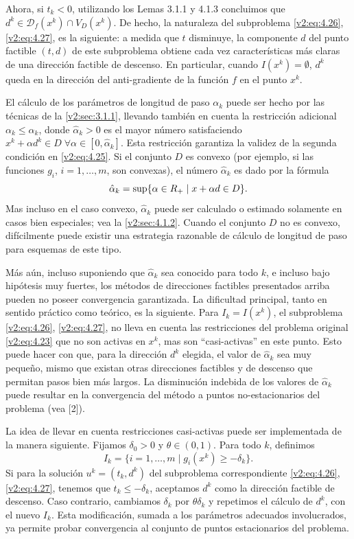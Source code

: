 Ahora, si $t_k < 0$, utilizando los Lemas 3.1.1 y 4.1.3 concluimos que $d^k \in \mathcal{D}_f(x^k) \cap V_D(x^k)$. De hecho, la naturaleza del subproblema \eqref{v2:eq:4.26}, \eqref{v2:eq:4.27}, es la siguiente: a medida que $t$ disminuye, la componente $d$ del punto factible $(t, d)$ de este subproblema obtiene cada vez características más claras de una dirección factible de descenso. En particular, cuando $I(x^k) = \emptyset$, $d^k$ queda en la dirección del anti-gradiente de la función $f$ en el punto $x^k$.

El cálculo de los parámetros de longitud de paso $\alpha_k$ puede ser hecho por las técnicas de la \cref{v2:sec:3.1.1}, llevando también en cuenta la restricción adicional $\alpha_k \le \hat{\alpha}_k$, donde $\hat{\alpha}_k > 0$ es el mayor número satisfaciendo $x^k + \alpha d^k \in D \; \forall \alpha \in [0, \hat{\alpha}_k]$. Esta restricción garantiza la validez de la segunda condición en \eqref{v2:eq:4.25}. Si el conjunto $D$ es convexo (por ejemplo, si las funciones $g_i$, $i = 1, \dots, m$, son convexas), el número $\hat{\alpha}_k$ es dado por la fórmula
\[
    \hat{\alpha}_k = \sup \{\alpha \in R_+ \mid x + \alpha d \in D \}.
\]
Mas incluso en el caso convexo, $\hat{\alpha}_k$ puede ser calculado o estimado solamente en casos bien especiales; vea la \cref{v2:sec:4.1.2}. Cuando el conjunto $D$ no es convexo, difícilmente puede existir una estrategia razonable de cálculo de longitud de paso para esquemas de este tipo.

Más aún, incluso suponiendo que $\hat{\alpha}_k$ sea conocido para todo $k$, e incluso bajo hipótesis muy fuertes, los métodos de direcciones factibles presentados arriba pueden no poseer convergencia garantizada. La dificultad principal, tanto en sentido práctico como teórico, es la siguiente. Para $I_k = I(x^k)$, el subproblema \eqref{v2:eq:4.26}, \eqref{v2:eq:4.27}, no lleva en cuenta las restricciones del problema original \eqref{v2:eq:4.23} que no son activas en $x^k$, mas son ``casi-activas'' en este punto. Esto puede hacer con que, para la dirección $d^k$ elegida, el valor de $\hat{\alpha}_k$ sea muy pequeño, mismo que existan otras direcciones factibles y de descenso que permitan pasos bien más largos. La disminución indebida de los valores de $\hat{\alpha}_k$ puede resultar en la convergencia del método a puntos no-estacionarios del problema (vea [2]).

La idea de llevar en cuenta restricciones casi-activas puede ser implementada de la manera siguiente. Fijamos $\delta_0 > 0$ y $\theta \in (0, 1)$. Para todo $k$, definimos
\[
    I_k = \{i = 1, \dots, m \mid g_i(x^k) \ge -\delta_k\}.
\]
Si para la solución $u^k = (t_k, d^k)$ del subproblema correspondiente \eqref{v2:eq:4.26}, \eqref{v2:eq:4.27}, tenemos que $t_k \le -\delta_k$, aceptamos $d^k$ como la dirección factible de descenso. Caso contrario, cambiamos $\delta_k$ por $\theta\delta_k$ y repetimos el cálculo de $d^k$, con el nuevo $I_k$. Esta modificación, sumada a los parámetros adecuados involucrados, ya permite probar convergencia al conjunto de puntos estacionarios del problema.


